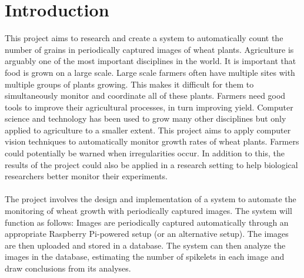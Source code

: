 \def\baselinestretch{1}

\chapter{Introduction}

\def\baselinestretch{1.66}



This project aims to research and create a system to automatically count the number of grains in periodically captured images of wheat plants. 
%
Agriculture is arguably one of the most important disciplines in the world. It is important that food is grown on a large scale. Large scale farmers often have multiple sites with multiple groups of plants growing. This makes it difficult for them to simultaneously monitor and coordinate all of these plants. Farmers need good tools to improve their agricultural processes, in turn improving yield.
%
Computer science and technology has been used to grow many other disciplines but only applied to agriculture to a smaller extent. This project aims to apply computer vision techniques to automatically monitor growth rates of wheat plants. Farmers could potentially be warned when irregularities occur. In addition to this, the results of the project could also be applied in a research setting to help biological researchers better monitor their experiments.\\ \\
%
The project involves the design and implementation of a system to automate the monitoring of wheat growth with periodically captured images. The system will function as follows: Images are periodically captured automatically through an appropriate Raspberry Pi-powered setup (or an alternative setup). The images are then uploaded and stored in a database. The system can then analyze the images in the database, estimating the number of spikelets in each image and draw conclusions from its analyses.

\smallskip

\goodbreak

